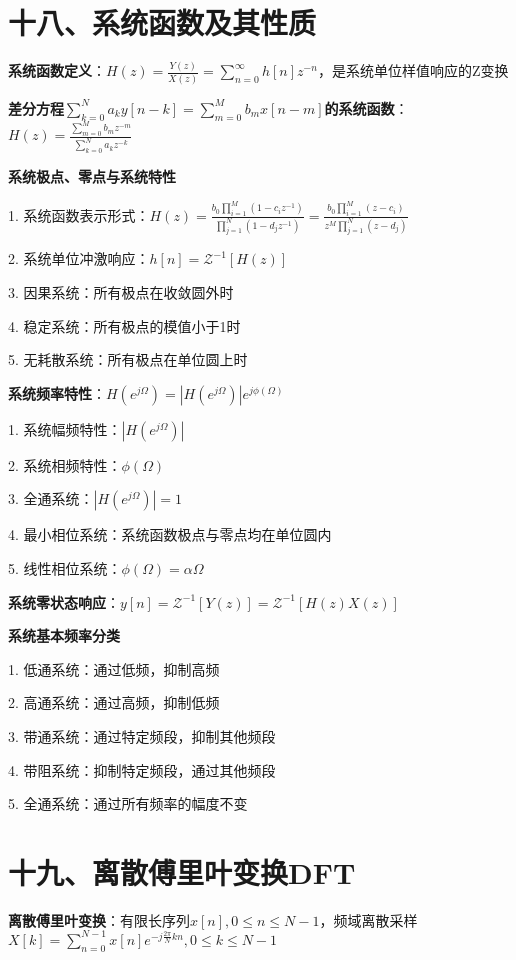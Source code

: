 \section*{十八、系统函数及其性质}

\textbf{系统函数定义}：$H(z) = \frac{Y(z)}{X(z)} = \sum_{n=0}^{\infty}h[n]z^{-n}$，是系统单位样值响应的Z变换

\textbf{差分方程$\sum_{k=0}^{N} a_k y[n-k] = \sum_{m=0}^{M} b_m x[n-m]$的系统函数}：$H(z) = \frac{\sum_{m=0}^{M}b_m z^{-m}}{\sum_{k=0}^{N}a_k z^{-k}}$

\textbf{系统极点、零点与系统特性}

1. 系统函数表示形式：$H(z) = \frac{b_0 \prod_{i=1}^{M}(1-c_i z^{-1})}{\prod_{j=1}^{N}(1-d_j z^{-1})} = \frac{b_0 \prod_{i=1}^{M}(z-c_i)}{z^M\prod_{j=1}^{N}(z-d_j)}$

2. 系统单位冲激响应：$h[n] = \mathcal{Z}^{-1}[H(z)]$

3. 因果系统：所有极点在收敛圆外时

4. 稳定系统：所有极点的模值小于1时

5. 无耗散系统：所有极点在单位圆上时

\textbf{系统频率特性}：$H(e^{j\Omega})=|H(e^{j\Omega})|e^{j\phi(\Omega)}$

1. 系统幅频特性：$|H(e^{j\Omega})|$

2. 系统相频特性：$\phi(\Omega)$

3. 全通系统：$|H(e^{j\Omega})| = 1$

4. 最小相位系统：系统函数极点与零点均在单位圆内

5. 线性相位系统：$\phi(\Omega) = \alpha\Omega$

\textbf{系统零状态响应}：$y[n] = \mathcal{Z}^{-1}[Y(z)] = \mathcal{Z}^{-1}[H(z)X(z)]$

\textbf{系统基本频率分类}

1. 低通系统：通过低频，抑制高频

2. 高通系统：通过高频，抑制低频

3. 带通系统：通过特定频段，抑制其他频段

4. 带阻系统：抑制特定频段，通过其他频段

5. 全通系统：通过所有频率的幅度不变

\section*{十九、离散傅里叶变换DFT}

\textbf{离散傅里叶变换}：有限长序列$x[n], 0 \leq n \leq N-1$，频域离散采样$X[k] = \sum_{n=0}^{N-1}x[n]e^{-j\frac{2\pi}{N}kn}, 0 \leq k \leq N-1$

